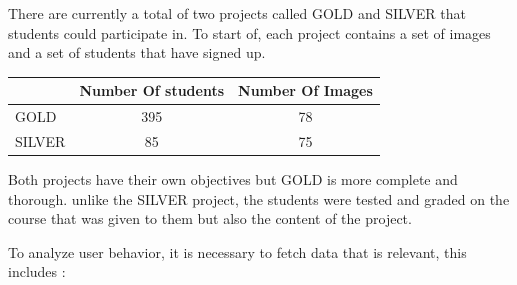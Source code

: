 \documentclass[a4paper,11pt]{report}
\numberwithin{figure}{section} %
\begin{document}
          There are currently a total of two projects called GOLD and SILVER that students could participate in.
          To start of, each project contains a set of images and a set of students that have signed up.
          
          \begin{center}
          \begin{tabular}{| l | c | c |}
          \hline
           & Number Of students & Number Of Images \\ \hline
           GOLD & 395 & 78 \\ \hline
           SILVER & 85 & 75 \\
          \hline
          \end{tabular}
          \end{center}

		  Both projects have their own objectives but GOLD is more complete and thorough.
		  unlike the SILVER project, the students were tested and graded on the course that was given to them but also the content of the project.
         
          To analyze user behavior, it is necessary to fetch data that is relevant, this includes :
          
\end{document}
